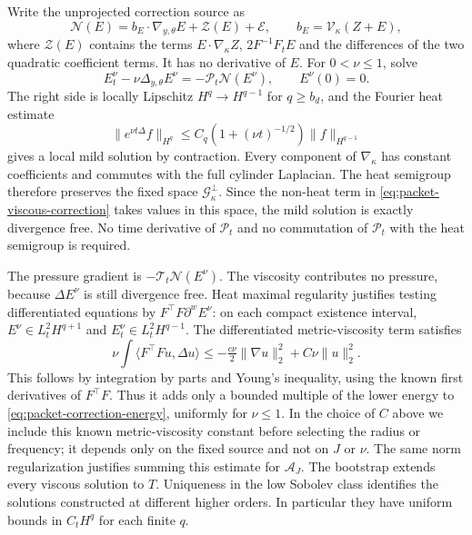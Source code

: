 \documentclass[11pt]{article}
\theoremstyle{definition}
\begin{document}
Write the unprojected correction source as
\[
 \mathcal N(E)=b_E\cdot\nabla_{y,\theta}E+\mathcal Z(E)+\mathcal E,
 \qquad b_E=\mathcal V_\kappa(Z+E),
\]
where $\mathcal Z(E)$ contains the terms $E\cdot\nabla_\kappa Z$,
$2F^{-1}F_tE$ and the differences of the two quadratic coefficient
terms. It has no derivative of $E$. For $0<\nu\le1$, solve
\begin{equation}\label{eq:packet-viscous-correction}
 E_t^\nu-\nu\Delta_{y,\theta}E^\nu
       =-\mathcal P_t\mathcal N(E^\nu),\qquad E^\nu(0)=0.
\end{equation}
The right side is locally Lipschitz $H^q\to H^{q-1}$ for
$q\ge b_d$, and the Fourier heat estimate
\[
 \|e^{\nu t\Delta}f\|_{H^q}
       \le C_q(1+(\nu t)^{-1/2})\|f\|_{H^{q-1}}
\]
gives a local mild solution by contraction. Every component of
$\nabla_\kappa$ has constant coefficients and commutes with the full
cylinder Laplacian. The heat semigroup therefore preserves the fixed
space $\mathscr G_\kappa^\perp$. Since the non-heat term in
\eqref{eq:packet-viscous-correction} takes values in this space, the mild
solution is exactly divergence free. No time derivative of
$\mathcal P_t$ and no commutation of $\mathcal P_t$ with the heat
semigroup is required.

The pressure gradient is
$-\mathcal T_t\mathcal N(E^\nu)$. The viscosity contributes no pressure,
because $\Delta E^\nu$ is still divergence free. Heat maximal regularity
justifies testing differentiated equations by
$F^{\top}F\partial^wE^\nu$: on each compact existence interval,
$E^\nu\in L^2_tH^{q+1}$ and $E_t^\nu\in L^2_tH^{q-1}$.
The differentiated metric-viscosity term satisfies
\[
 \nu\int\langle F^{\top}F u,\Delta u\rangle
       \le-\tfrac{c\nu}{2}\|\nabla u\|_2^2+C\nu\|u\|_2^2.
\]
This follows by integration by parts and Young's inequality, using the
known first derivatives of $F^{\top}F$. Thus it adds only a bounded
multiple of the lower energy to \eqref{eq:packet-correction-energy},
uniformly for $\nu\le1$. In the choice of $C$ above we include this
known metric-viscosity constant before selecting the radius or frequency;
it depends only on the fixed source and not on $J$ or $\nu$.
The same norm regularization justifies summing this estimate for
$\mathcal A_J$. The bootstrap extends every viscous solution
to $T$. Uniqueness in the low Sobolev class identifies the solutions
constructed at different higher orders. In particular they have uniform
bounds in $C_tH^q$ for each finite $q$.
\end{document}
